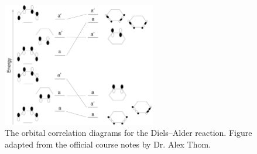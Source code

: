 \documentclass{article}
\theoremstyle{plain}\theoremheaderfont{\normalfont\itshape}\theorembodyfont{\rmfamily}\theoremseparator{.}\newtheorem*{rem}{Remark}\newtheorem*{ex}{Example}\newtheorem*{proof}{Proof}\newtheorem*{altp}{Alternative proof}
\theoremstyle{plain}\theoremheaderfont{\normalfont\bfseries}\theorembodyfont{\rmfamily}\theoremseparator{.}\newtheorem{thm}{Theorem}[section]\newtheorem{lem}[thm]{Lemma}\newtheorem{prop}[thm]{Proposition}\newtheorem*{cor}{Corollary}\newtheorem{defn}[thm]{Definition}\newtheorem{clm}[thm]{Claim}\newtheorem{clminproof}{Claim}\newtheorem{pos}{Postulate}[section]
\theoremstyle{break}\theoremheaderfont{\normalfont\itshape}\theorembodyfont{\rmfamily}\theoremseparator{.\medskip}\newtheorem*{proofskip}{Proof}\newtheorem*{exs}{Examples}\newtheorem*{rems}{Remarks}
\theoremstyle{break}\theoremheaderfont{\normalfont\bfseries}\theorembodyfont{\rmfamily}\theoremseparator{.\medskip}\newtheorem{lemskip}[thm]{Lemma}\newtheorem{defnskip}[thm]{Definition}\newtheorem{propskip}[thm]{Proposition}\newtheorem{thmskip}[thm]{Theorem}
\numberwithin{equation}{section}
\begin{document}
    \begin{figure}
        \centering
        \includegraphics[width=0.6\textwidth]{DA_orbital_corr.png}
        \caption{The orbital correlation diagrams for the Diels--Alder reaction. Figure adapted from the official course notes by Dr. Alex Thom.}
    \end{figure}
\end{document}
